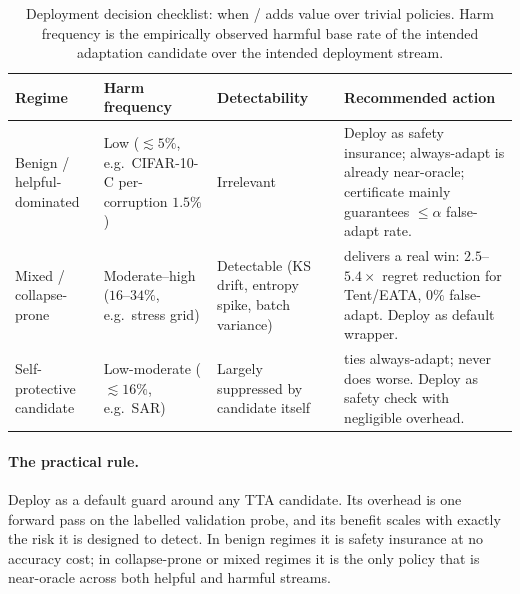 \begin{table}[ht]
\centering
\small
\caption{Deployment decision checklist: when \KBound{}/\KGA{} adds value over
trivial policies.  Harm frequency is the empirically observed harmful base rate
of the intended adaptation candidate over the intended deployment stream.}
\label{tab:disc-checklist}
\begin{tabular}{p{}p{}p{}p{}}
\toprule
Regime & Harm frequency & Detectability & Recommended action \\
\midrule
Benign / helpful-dominated &
  Low ($\lesssim 5\%$, e.g.\ CIFAR-10-C per-corruption $1.5\%$) &
  Irrelevant &
  Deploy \KGA{} as safety insurance; always-adapt is already near-oracle;
  certificate mainly guarantees $\leq\alpha$ false-adapt rate. \\
\midrule
Mixed / collapse-prone &
  Moderate--high ($16$--$34\%$, e.g.\ stress grid) &
  Detectable (KS drift, entropy spike, batch variance) &
  \KGA{} delivers a real win: $2.5$--$5.4{\times}$ regret reduction for
  Tent/EATA, $0\%$ false-adapt.  Deploy as default wrapper. \\
\midrule
Self-protective candidate &
  Low-moderate ($\lesssim 16\%$, e.g.\ SAR) &
  Largely suppressed by candidate itself &
  \KGA{} ties always-adapt; never does worse.  Deploy as safety check
  with negligible overhead. \\
\bottomrule
\end{tabular}
\end{table}

\paragraph{The practical rule.}
Deploy \KGA{} as a default guard around any TTA candidate.  Its overhead is one
forward pass on the labelled validation probe, and its benefit scales with exactly
the risk it is designed to detect.  In benign regimes it is safety insurance at no
accuracy cost; in collapse-prone or mixed regimes it is the only policy that is
near-oracle across both helpful and harmful streams.

